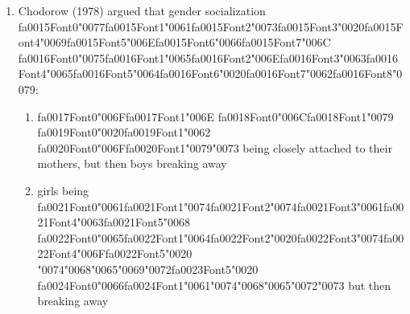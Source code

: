 \documentclass[12pt]{article}
\begin{document}
\begin{enumerate}[label=\arabic*.]
\begin{enumerate}[label=(\alph*)]
    \item {\char"0041}{\csname fa0012Font1\endcsname\char"0020}{\csname fa0012Font2\endcsname\char"0073}{\csname fa0012Font3\endcsname\char"0065}{\csname fa0012Font4\endcsname\char"0063} {\csname fa0013Font0\endcsname\char"006F}{\csname fa0013Font1\endcsname\char"006E}{\csname fa0013Font2\endcsname\char"0064}{\csname fa0013Font3\endcsname\char"0061}{\csname fa0013Font4\endcsname\char"0072}{\csname fa0013Font5\endcsname\char"0079} {\csname fa0014Font0\endcsname\char"0020}{\csname fa0014Font1\endcsname\char"0067}{\csname fa0014Font2\endcsname\char"0072}{\char"006F}{\csname fa0014Font4\endcsname\char"0075}{\csname fa0014Font5\endcsname\char"0070}
\end{enumerate}
\item Chodorow (1978) argued that gender socialization {\csname fa0015Font0\endcsname\char"0077}{\csname fa0015Font1\endcsname\char"0061}{\csname fa0015Font2\endcsname\char"0073}{\csname fa0015Font3\endcsname\char"0020}{\csname fa0015Font4\endcsname\char"0069}{\csname fa0015Font5\endcsname\char"006E}{\csname fa0015Font6\endcsname\char"0066}{\csname fa0015Font7\endcsname\char"006C} {\csname fa0016Font0\endcsname\char"0075}{\csname fa0016Font1\endcsname\char"0065}{\csname fa0016Font2\endcsname\char"006E}{\csname fa0016Font3\endcsname\char"0063}{\csname fa0016Font4\endcsname\char"0065}{\csname fa0016Font5\endcsname\char"0064}{\csname fa0016Font6\endcsname\char"0020}{\csname fa0016Font7\endcsname\char"0062}{\csname fa0016Font8\endcsname\char"0079}:
\begin{enumerate}[label=(\alph*)]
    \item {\csname fa0017Font0\endcsname\char"006F}{\csname fa0017Font1\endcsname\char"006E} {\csname fa0018Font0\endcsname\char"006C}{\csname fa0018Font1\endcsname\char"0079} {\csname fa0019Font0\endcsname\char"0020}{\csname fa0019Font1\endcsname\char"0062} {\csname fa0020Font0\endcsname\char"006F}{\csname fa0020Font1\endcsname\char"0079}{\char"0073} being closely attached to their mothers, but then boys breaking away
    \item girls being {\csname fa0021Font0\endcsname\char"0061}{\csname fa0021Font1\endcsname\char"0074}{\csname fa0021Font2\endcsname\char"0074}{\csname fa0021Font3\endcsname\char"0061}{\csname fa0021Font4\endcsname\char"0063}{\csname fa0021Font5\endcsname\char"0068} {\csname fa0022Font0\endcsname\char"0065}{\csname fa0022Font1\endcsname\char"0064}{\csname fa0022Font2\endcsname\char"0020}{\csname fa0022Font3\endcsname\char"0074}{\csname fa0022Font4\endcsname\char"006F}{\csname fa0022Font5\endcsname\char"0020} {\char"0074}{\char"0068}{\char"0065}{\char"0069}{\char"0072}{\csname fa0023Font5\endcsname\char"0020} {\csname fa0024Font0\endcsname\char"0066}{\csname fa0024Font1\endcsname\char"0061}{\char"0074}{\char"0068}{\char"0065}{\char"0072}{\char"0073} but then breaking away

\end{enumerate}
\end{enumerate}
\end{document}
